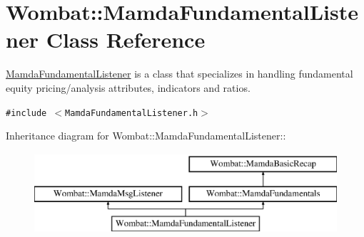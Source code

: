 \hypertarget{classWombat_1_1MamdaFundamentalListener}{
\section{Wombat::Mamda\-Fundamental\-Listener Class Reference}
\label{classWombat_1_1MamdaFundamentalListener}
}
\hyperlink{classWombat_1_1MamdaFundamentalListener}{Mamda\-Fundamental\-Listener} is a class that specializes in handling fundamental equity pricing/analysis attributes, indicators and ratios.  


{\tt \#include $<$Mamda\-Fundamental\-Listener.h$>$}

Inheritance diagram for Wombat::Mamda\-Fundamental\-Listener::\begin{figure}[H]
\begin{center}
\leavevmode
\includegraphics[height=3cm]{classWombat_1_1MamdaFundamentalListener}
\end{center}
\end{figure}
